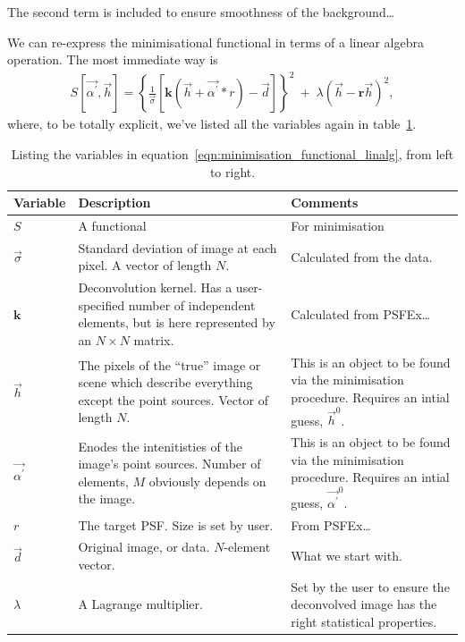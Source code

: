 \documentclass[letterpaper, 11pt]{article}
\def\MORE{{\color{red}{\bf MORE}}\xspace}
\begin{document}
The second term is included to ensure smoothness of the background\ldots \MORE

We can re-express the minimisational functional in terms of a linear algebra operation. The most immediate way is
\begin{align}
	S\left[\vec{\alpha^\prime}, \vec{h}\right] = \left\{ \frac{1}{\vec\sigma} \left[ \mathbf k \left( \vec{h} + \vec{\alpha^\prime} \ast r \right) - \vec{d} \right]\right\}^2\
			+\; \lambda \left( \vec{h} - \mathbf{r}\vec{h} \right)^2, \label{eqn:minimisation_functional_linalg}
\end{align}
where, to be totally explicit, we've listed all the variables again in table~\ref{tbl:minimisation_functional_linalg}.

\begin{center}
	\begin{table}[h!]
		\begin{tabularx}{\textwidth}{l | X | X}
			\hline
			Variable	& Description & Comments\\ \hline
			$S$ 	& A functional & For minimisation\\ \hline
			$\vec\sigma$ & Standard deviation of image at each pixel. A vector of length $N$. & Calculated from the data.\\ \hline
			$\mathbf k$	& Deconvolution kernel. Has a user-specified number of independent elements, but is here represented by an $N\!\times\!N$ matrix. & Calculated from PSFEx\ldots\\ \hline
			$\vec h$		& The pixels of the ``true'' image or scene which describe everything except the point sources. Vector of length $N$. & This is an object to be found via the minimisation procedure. Requires an intial guess, $\vec h^0$.\\ \hline
			$\vec{\alpha^\prime}$	& Enodes the intenitisties of the image's point sources. Number of elements, $M$ obviously depends on the image. & This is an object to be found via the minimisation procedure. Requires an intial guess, $\vec{\alpha^\prime}^0$.\\ \hline
			$r$	& The target PSF. Size is set by user. & From PSFEx\ldots\\ \hline 
			$\vec d$	& Original image, or data. $N$-element vector. & What we start with.\\ \hline
			$\lambda$	& A Lagrange multiplier. & Set by the user to ensure the deconvolved image has the right statistical properties.\\
			\hline
		\end{tabularx}
		\caption{Listing the variables in equation~\ref{eqn:minimisation_functional_linalg}, from left to right.}
		\label{tbl:minimisation_functional_linalg}
	\end{table}
\end{center}
\end{document}

